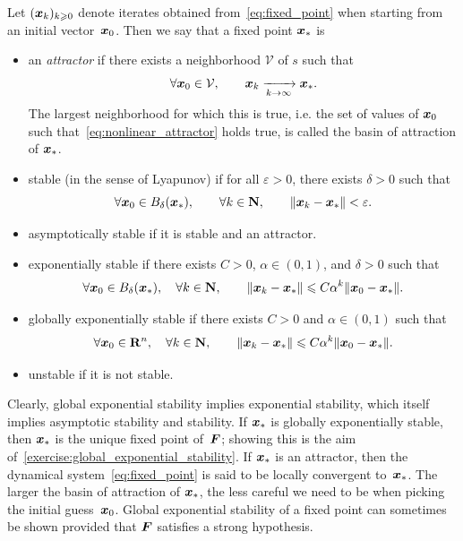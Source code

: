 \begin{definition}
    Let $(\mathbf{\boldsymbol{x}}_k)_{k\geqslant0}$ denote iterates obtained from~\eqref{eq:fixed_point} when starting from an initial vector~$\mathbf{\boldsymbol{x}}_0$.
    Then we say that a fixed point $\mathbf{\boldsymbol{x}}_*$ is
    \begin{itemize}
        \item
            an \emph{attractor} if there exists a neighborhood $\mathcal V$ of $s$ such that
            \begin{equation}
                \label{eq:nonlinear_attractor}
                \forall \mathbf{\boldsymbol{x}}_0 \in \mathcal V, \qquad
                \mathbf{\boldsymbol{x}}_k \xrightarrow[k \to \infty]{} \mathbf{\boldsymbol{x}}_*.
            \end{equation}
            The largest neighborhood for which this is true,
            i.e. the set of values of $\mathbf{\boldsymbol{x}}_0$ such that~\eqref{eq:nonlinear_attractor} holds true,
            is called the basin of attraction of $\mathbf{\boldsymbol{x}}_*$.

        \item
            stable (in the sense of Lyapunov) if for all $\varepsilon > 0$,
            there exists $\delta > 0$ such that
            \[
                \forall \mathbf{\boldsymbol{x}}_0 \in B_{\delta}(\mathbf{\boldsymbol{x}}_*), \qquad
                \forall k \in \mathbf N, \qquad
                \lVert\mathbf{\boldsymbol{x}}_k - \mathbf{\boldsymbol{x}}_*\rVert < \varepsilon.
            \]

        \item
            asymptotically stable if it is stable and an attractor.

        \item
            exponentially stable if there exists $C > 0$, $\alpha \in (0, 1)$, and $\delta > 0$ such that
            \[
                \forall \mathbf{\boldsymbol{x}}_0 \in B_{\delta}(\mathbf{\boldsymbol{x}}_*),
                \quad \forall k \in \mathbf N, \qquad
                \lVert\mathbf{\boldsymbol{x}}_k - \mathbf{\boldsymbol{x}}_*\rVert \leqslant C \alpha^k \lVert\mathbf{\boldsymbol{x}}_0 - \mathbf{\boldsymbol{x}}_*\rVert.
            \]

        \item
            globally exponentially stable if there exists $C > 0$ and $\alpha \in (0, 1)$ such that
            \[
                \forall \mathbf{\boldsymbol{x}}_0 \in \mathbf R^n,
                \quad \forall k \in \mathbf N, \qquad
                \lVert\mathbf{\boldsymbol{x}}_k - \mathbf{\boldsymbol{x}}_*\rVert \leqslant C \alpha^k \lVert\mathbf{\boldsymbol{x}}_0 - \mathbf{\boldsymbol{x}}_*\rVert.
            \]
        \item
            unstable if it is not stable.
    \end{itemize}
\end{definition}
Clearly, global exponential stability implies exponential stability,
which itself implies asymptotic stability and stability.
If $\mathbf{\boldsymbol{x}}_*$ is globally exponentially stable,
then $\mathbf{\boldsymbol{x}}_*$ is the unique fixed point of~$\mathbf{\boldsymbol{F}}$;
showing this is the aim of~\cref{exercise:global_exponential_stability}.
If $\mathbf{\boldsymbol{x}}_*$ is an attractor,
then the dynamical system~\eqref{eq:fixed_point} is said to be locally convergent to~$\mathbf{\boldsymbol{x}}_*$.
The larger the basin of attraction of $\mathbf{\boldsymbol{x}}_*$,
the less careful we need to be when picking the initial guess~$\mathbf{\boldsymbol{x}}_0$.
Global exponential stability of a fixed point can sometimes be shown
provided that $\mathbf{\boldsymbol{F}}$ satisfies a strong hypothesis.

